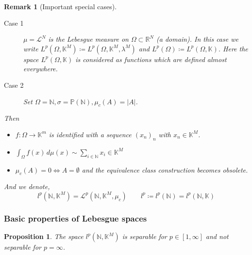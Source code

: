 \documentclass[a4paper]{article}
\newcounter{lecref}[section]
\numberwithin{lecref}{section}
\newtheorem*{Remark}{Remark}
\newtheorem{proposition}[lecref]{Proposition}
\newcommand{\Abs}[1]{\left|#1\right|}
\begin{document}
\begin{Remark}[Important special cases]
	\begin{description}
		\item[Case 1] 
			$\mu = \mathcal L^N$ is the Lebesgue measure on $\Omega \subset \mathbb R^N$ (a domain).
			In this case we write $L^p(\Omega, \mathbb K^M) \coloneqq L^p(\Omega, \mathbb K^M, \lambda^M)$ and $L^p(\Omega) \coloneqq L^p(\Omega, \mathbb K)$.
			Here the space $L^p(\Omega, \mathbb K)$ is considered as functions which are defined almost everywhere.
		\item[Case 2]
			Set $\Omega = \mathbb N, \sigma = \mathbb P(\mathbb N), \mu_c(A) = \Abs{A}$.
	\end{description}
	Then
	\begin{itemize}
		\item $f: \Omega \to \mathbb K^m$ is identified with a sequence $(x_n)_n$ with $x_n \in \mathbb K^M$.
		\item $\int_{\Omega} f(x) \, d\mu(x) \sim \sum_{i \in \mathbb N} x_i \in \mathbb K^M$
		\item $\mu_c(A) = 0 \iff A = \emptyset$ and the equivalence class construction becomes obsolete.
	\end{itemize}
	And we denote,
	\[ l^p(\mathbb N, \mathbb K^M) = \mathcal L^p(\mathbb N, \mathbb K^M, \mu_c) \qquad l^p \coloneqq l^p(\mathbb N) = l^p(\mathbb N, \mathbb K) \]
\end{Remark}

\subsubsection{Basic properties of Lebesgue spaces}

\begin{proposition}
	\label{proposition:2.16}
	The space $l^p(\mathbb N, \mathbb K^M)$ is separable for $p \in [1, \infty]$ and \emph{not} separable for $p = \infty$.
\end{proposition}
\end{document}
